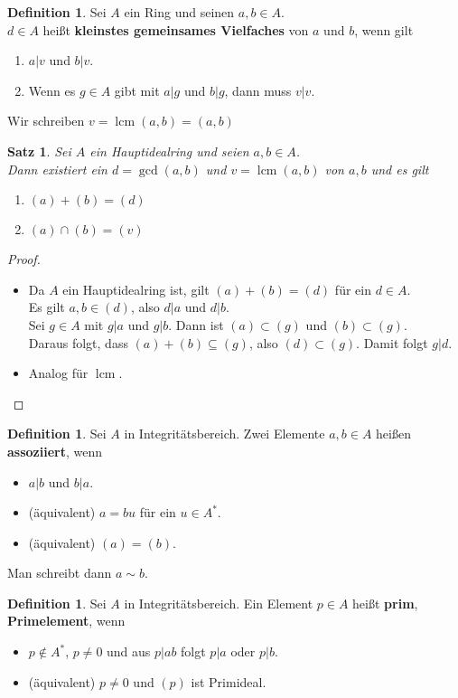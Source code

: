 \documentclass[10pt,a4paper]{article}
\newcommand{\lcm}{\operatorname{lcm}}
\theoremstyle{plain}
\newtheorem{satz}[theorem]{Satz}
\theoremstyle{definition}
\newtheorem{definition}[theorem]{Definition}
\theoremstyle{remark}
\begin{document}
	\begin{definition}
		Sei $A$ ein Ring und seinen $a,b\in A$.\\
		$d\in A$ heißt \textbf{kleinstes gemeinsames Vielfaches} von $a$ und $b$, wenn gilt
		\begin{enumerate}
			\item $a|v$ und $b|v$.
			\item Wenn es $g\in A$ gibt mit $a|g$ und $b|g$, dann muss $v|v$.
		\end{enumerate}
		Wir schreiben $v=\lcm(a,b)=(a,b)$
	\end{definition}

	\begin{satz}
		Sei $A$ ein Hauptidealring und seien $a,b\in A$.\\
		Dann existiert ein $d=\gcd(a,b)$ und $v=\lcm(a,b)$ von $a,b$ und es gilt
		\begin{enumerate}
			\item $(a)+(b)=(d)$
			\item $(a)\cap (b)=(v)$
		\end{enumerate}
	\end{satz}
	\begin{proof}
		\begin{itemize}
			\item Da $A$ ein Hauptidealring ist, gilt $(a)+(b)=(d)$ für ein $d\in A$.\\
			Es gilt $a,b\in(d)$, also $d|a$ und $d|b$.\\
			Sei $g\in A$ mit $g|a$ und $g|b$. Dann ist $(a)\subset (g)$ und $(b)\subset(g)$.\\
			Daraus folgt, dass $(a)+(b)\subseteq(g)$, also $(d)\subset (g)$. Damit folgt $g|d$.
			\item Analog für $\lcm$.
		\end{itemize}
	\end{proof}

	\begin{definition}
		Sei $A$ in Integritätsbereich. Zwei Elemente $a,b\in A$ heißen \textbf{assoziiert}, wenn
		 \begin{itemize}
		 	\item $a|b$ und $b|a$.
			\item (äquivalent) $a=bu$ für ein $u\in A^*$.
			\item (äquivalent) $(a)=(b)$.
		 \end{itemize}
	 Man schreibt dann $a\sim b$.
	\end{definition}

	\begin{definition}
		Sei $A$ in Integritätsbereich. Ein Element $p\in A$ heißt \textbf{prim}, \textbf{Primelement}, wenn
		\begin{itemize}
			\item $p\notin A^*$, $p\neq0$ und aus $p|ab$ folgt $p|a$ oder $p|b$.
			\item (äquivalent) $p\neq 0$ und $(p)$ ist Primideal.
		\end{itemize}
	\end{definition}
\end{document}
